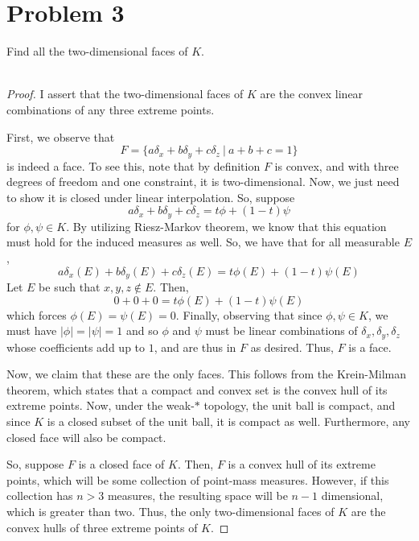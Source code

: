 \documentclass[fontsize=11pt]{scrartcl} %
\numberwithin{equation}{section} %
\numberwithin{figure}{section} %
\numberwithin{table}{section} %
\begin{document}
\newpage

\section*{Problem 3}
Find all the two-dimensional faces of $K$.
\\
\\
\begin{proof}
    I assert that the two-dimensional faces of $K$ are the convex linear
    combinations of any three extreme points.

    First, we observe that
    \[
        F = \{a\delta_x + b\delta_y + c\delta_z\ |\ a+b+c=1\}
    \]
    is indeed a face. To see this, note that by definition $F$ is convex, and
    with three degrees of freedom and one constraint, it is two-dimensional.
    Now, we just need to show it is closed under linear interpolation. So,
    suppose
    \[
        a\delta_x + b\delta_y + c\delta_z = t\phi + (1-t)\psi
    \]
    for $\phi,\psi\in K$. By utilizing Riesz-Markov theorem, we know that this
    equation must hold for the induced measures as well. So, we have that for
    all measurable $E$,
    \[
        a\delta_x(E) + b\delta_y(E) + c\delta_z(E) = t\phi(E) + (1-t)\psi(E)
    \]
    Let $E$ be such that $x,y,z\not\in E$. Then,
    \[
        0+0+0 = t\phi(E) + (1-t)\psi(E)
    \]
    which forces $\phi(E)=\psi(E) = 0$. Finally, observing that since
    $\phi,\psi\in K$, we must have $|\phi| = |\psi| = 1$ and so $\phi$ and
    $\psi$ must be linear combinations of $\delta_x,\delta_y,\delta_z$ whose
    coefficients add up to $1$, and are thus in $F$ as desired.
    Thus, $F$ is a face.

    Now, we claim that these are the only faces. This follows from the
    Krein-Milman theorem, which states that a compact and convex set is the
    convex hull of its extreme points. Now, under the weak-$*$ topology, the
    unit ball is compact, and since $K$ is a closed subset of the unit ball, it
    is compact as well. Furthermore, any closed face will also be compact. 
    
    So, suppose $F$ is a closed face of $K$. Then, $F$ is a convex hull of its
    extreme points, which will be some collection of point-mass measures.
    However, if this collection has $n>3$ measures, the resulting
    space will be $n-1$ dimensional, which is greater than two. Thus, the only
    two-dimensional faces of $K$ are the convex hulls of three extreme points of
    $K$.

\end{proof}
\end{document}
